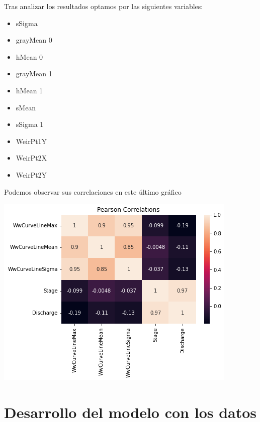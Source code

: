 \documentclass{article}
\begin{document}
        Tras analizar los resultados optamos por las siguientes variables:
            \begin{itemize}
                \item sSigma 
                \item grayMean 0 
                \item hMean 0 
                \item grayMean 1 
                \item hMean 1 
                \item sMean 
                \item sSigma 1
                \item WeirPt1Y 
                \item WeirPt2X 
                \item WeirPt2Y 
            \end{itemize}
    
        Podemos observar sus correlaciones en este último gráfico

         \includegraphics{images/Corr_pearson11.PNG} 



    \section{Desarrollo del modelo con los datos}
\end{document}
